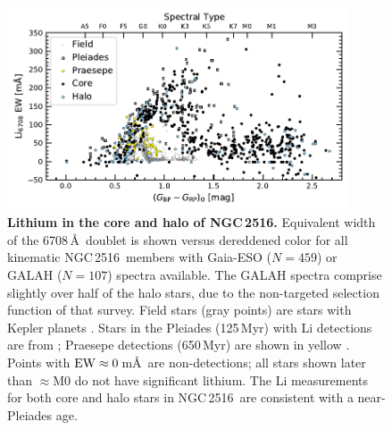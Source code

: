 \documentclass[12pt,twocolumn,tighten]{aastex63}
\newcommand{\cn}{NGC\,2516} %
\begin{document}
\begin{figure}[t]
	\begin{center}
		\leavevmode
			\includegraphics[width=0.9\textwidth]{f5a.pdf}
	\end{center}
	\vspace{-0.72cm}
  \caption{ {\bf Lithium in the core and halo of NGC\,2516.}
  Equivalent width of the 6708\,\AA\ doublet is shown versus
  dereddened color for all kinematic \cn\ members with Gaia-ESO
  ($N=459$) or GALAH ($N=107$) spectra available.  The GALAH spectra
  comprise slightly over half of the halo stars, due to the
  non-targeted selection function of that survey.  Field stars (gray
  points) are stars with Kepler planets
  \citep{berger_identifying_2018}.  Stars in the Pleiades (125\,Myr)
  with Li detections are from \citet{bouvier_pleiades_lirot_2018};
  Praesepe detections (650\,Myr) are shown in yellow
  \citep{soderblom_praesepe_1993}.  Points with ${\rm
  EW}\approx0\,$m\AA\ are non-detections; all stars shown
  later than $\approx$M0 do not have significant lithium.
  The Li measurements for both core and halo stars in \cn\ are
  consistent with a near-Pleiades age.
  \label{fig:lithiumcorehalo}
  }
\end{figure}
\end{document}
